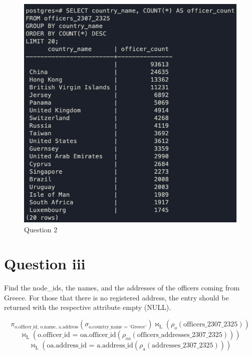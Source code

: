 \documentclass{article}
\begin{document}
\begin{figure}[h]
    \centering
    \includegraphics[width=0.9\linewidth]{Q2.png}
    \captionsetup{labelformat=empty}
    \caption{Question 2}
\end{figure}

\newpage

\section*{Question iii}
Find the node\_ids, the names, and the addresses of the officers coming from Greece. For those that there is no registered address, the entry should be returned with the respective attribute empty (NULL).

\[
    \pi_{\text{{o.officer\_id, o.name, a.address}}}(\sigma_{\text{{o.country\_name = 'Greece'}}}) \bowtie_{\text{L}}(\rho_o(\text{{officers\_2307\_2325}}))
\]
\[
    \bowtie_{\text{L}}({\text{{o.officer\_id = oa.officer\_id}}}  (\text{{\(\rho_{\text{{oa}}}(\text{{officers\_addresses\_2307\_2325}})\)}}))
\]
\[
    \bowtie_{\text{L}}({\text{{oa.address\_id = a.address\_id}}}(\rho_{\text{{a}}}(\text{{addresses\_2307\_2325}})))
\]
\end{document}
